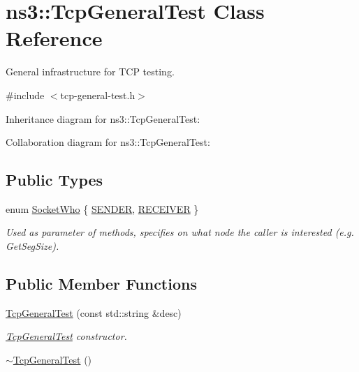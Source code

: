 \hypertarget{classns3_1_1TcpGeneralTest}{}\section{ns3\+:\+:Tcp\+General\+Test Class Reference}
\label{classns3_1_1TcpGeneralTest}


General infrastructure for T\+CP testing.  




{\ttfamily \#include $<$tcp-\/general-\/test.\+h$>$}



Inheritance diagram for ns3\+:\+:Tcp\+General\+Test\+:


Collaboration diagram for ns3\+:\+:Tcp\+General\+Test\+:
\subsection*{Public Types}
\begin{DoxyCompactItemize}
\item 
enum \hyperlink{classns3_1_1TcpGeneralTest_a29338e6b7137cad650c2ff835713f6ee}{Socket\+Who} \{ \hyperlink{classns3_1_1TcpGeneralTest_a29338e6b7137cad650c2ff835713f6eea5400e3d6b26928cf9e67ebb026462256}{S\+E\+N\+D\+ER}, 
\hyperlink{classns3_1_1TcpGeneralTest_a29338e6b7137cad650c2ff835713f6eea2a9a39a8fe1edd25b643a48956b8ecff}{R\+E\+C\+E\+I\+V\+ER}
 \}\begin{DoxyCompactList}\small\item\em Used as parameter of methods, specifies on what node the caller is interested (e.\+g. Get\+Seg\+Size). \end{DoxyCompactList}
\end{DoxyCompactItemize}
\subsection*{Public Member Functions}
\begin{DoxyCompactItemize}
\item 
\hyperlink{classns3_1_1TcpGeneralTest_aed700e733bc50b1e736cb52c0b71f3f8}{Tcp\+General\+Test} (const std\+::string \&desc)
\begin{DoxyCompactList}\small\item\em \hyperlink{classns3_1_1TcpGeneralTest}{Tcp\+General\+Test} constructor. \end{DoxyCompactList}\item 
\hyperlink{classns3_1_1TcpGeneralTest_a1e6eb059482f2b381a2c409763381b26}{$\sim$\+Tcp\+General\+Test} ()
\end{DoxyCompactItemize}
